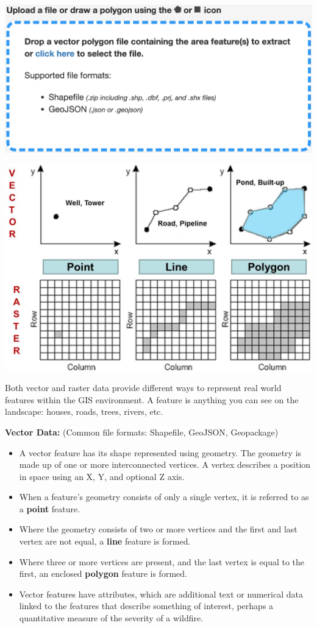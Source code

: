 \documentclass[oneside,a4paper,11pt,explicit]{book}
\begin{document}
\vspace{1em}

\centerline{\includegraphics[width=.5\textwidth]{BlankExtract.png}}

\begin{tcolorbox}[colback=yellow!5!white,colframe=IceCreamLeaf,title=\textbf{Vector vs. Raster Data}]

	\centerline{\includegraphics[width=.75\textwidth]{Vector_vs_Raster.png}}

	Both vector and raster data provide different ways to represent real world features within the GIS environment. A feature is anything you can see on the landscape: houses, roads, trees, rivers, etc. 

	\vspace{.5em}

	\textbf{Vector Data:} (Common file formats: Shapefile, GeoJSON, Geopackage)
	\begin{itemize}
		\item A vector feature has its shape represented using geometry. The geometry is made up of one or more interconnected vertices. A vertex describes a position in space using an X, Y, and optional Z axis.
		\item When a feature's geometry consists of only a single vertex, it is referred to as a \textbf{point} feature.
		\item Where the geometry consists of two or more vertices and the first and last vertex are not equal, a \textbf{line} feature is formed.
		\item Where three or more vertices are present, and the last vertex is equal to the first, an enclosed \textbf{polygon} feature is formed. 
		\item Vector features have attributes, which are additional text or numerical data linked to the features that describe something of interest, perhaps a quantitative measure of the severity of a wildfire.
	\end{itemize}


\end{tcolorbox}
\end{document}
